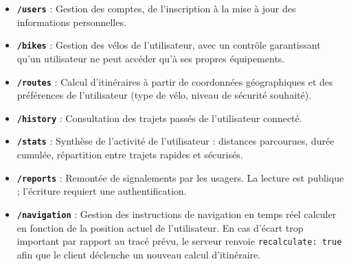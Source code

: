 \begin{itemize}
    \item \textbf{\texttt{/users}} : Gestion des comptes, de l'inscription à la mise à jour des informations personnelles.
    \item \textbf{\texttt{/bikes}} : Gestion des vélos de l'utilisateur, avec un contrôle garantissant qu'un utilisateur ne peut accéder qu'à ses propres équipements.
    \item \textbf{\texttt{/routes}} : Calcul d'itinéraires à partir de coordonnées géographiques et des préférences de l'utilisateur (type de vélo, niveau de sécurité souhaité).
    \item \textbf{\texttt{/history}} : Consultation des trajets passés de l'utilisateur connecté.
    \item \textbf{\texttt{/stats}} : Synthèse de l'activité de l'utilisateur : distances parcourues, durée cumulée, répartition entre trajets rapides et sécurisés.
    \item \textbf{\texttt{/reports}} : Remontée de signalements par les usagers. La lecture est publique ; l'écriture requiert une authentification.
    \item \textbf{\texttt{/navigation}} : Gestion des instructions de navigation en temps réel calculer en fonction de la position actuel de l'utilisateur. En cas d'écart trop important par rapport au tracé prévu, le serveur renvoie \texttt{recalculate: true} afin que le client déclenche un nouveau calcul d'itinéraire.
\end{itemize}
